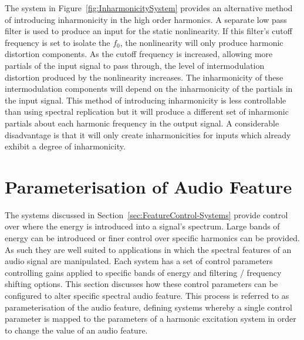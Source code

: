 		The system in Figure~\ref{fig:InharmonicitySystem} provides an alternative method of introducing
		inharmonicity in the high order harmonics. A separate low pass filter is used to produce an input for the
		static nonlinearity. If this filter's cutoff frequency is set to isolate the $f_{0}$, the nonlinearity will
		only produce harmonic distortion components. As the cutoff frequency is increased, allowing more partials
		of the input signal to pass through, the level of intermodulation distortion produced by the nonlinearity
		increases. The inharmonicity of these intermodulation components will depend on the inharmonicity of the
		partials in the input signal. This method of introducing inharmonicity is less controllable than using
		spectral replication but it will produce a different set of inharmonic partials about each harmonic
		frequency in the output signal. A considerable disadvantage is that it will only create inharmonicities for
		inputs which already exhibit a degree of inharmonicity.

\section{Parameterisation of Audio Feature}
\label{sec:FeatureControl-Parameterisation}
	The systems discussed in Section~\ref{sec:FeatureControl-Systems} provide control over where the energy is
	introduced into a signal's spectrum. Large bands of energy can be introduced or finer control over specific
	harmonics can be provided. As such they are well suited to applications in which the spectral features of an audio
	signal are manipulated. Each system has a set of control parameters controlling gains applied to specific bands of
	energy and filtering / frequency shifting options. This section discusses how these control parameters can be
	configured to alter specific spectral audio feature. This process is referred to as parameterisation of the audio
	feature, defining systems whereby a single control parameter is mapped to the parameters of a harmonic excitation
	system in order to change the value of an audio feature.


